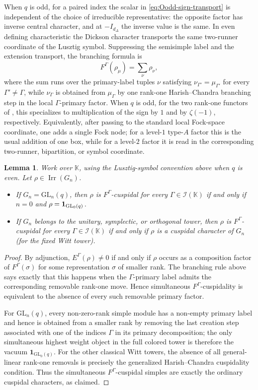 \documentclass[12pt]{amsart}
\numberwithin{itemcounter}{subsection}
\theoremstyle{plain}
\newtheorem{lemma}[theorem]{Lemma}
\theoremstyle{definition}
\theoremstyle{remark}
\numberwithin{equation}{section}
\def\bbK{\mathbb{K}}
\def\calI{\mathcal{I}}
\def\Irr{{\operatorname{Irr}\nolimits}}
\def\GL{\mathrm{GL}}
\begin{document}
When $q$ is odd, for a paired index the scalar in
\eqref{eq:Oodd-sign-transport} is independent of the choice of irreducible representative: the
opposite factor has inverse central character, and at \(-I_{d_\Delta}\) the
inverse value is the same.  In even defining characteristic the Dickson
character transports the same two-runner coordinate of the Lusztig symbol.  Suppressing
the semisimple label and the extension transport, the branching formula is
\[
 F^\Gamma(\rho_{\mu})=\sum_{\nu}\rho_{\nu},
\]
where the sum runs over the primary-label tuples \(\nu\) satisfying
\(\nu_{\Gamma'}=\mu_{\Gamma'}\) for every \(\Gamma'\ne\Gamma\), while
\(\nu_\Gamma\) is obtained from \(\mu_\Gamma\) by one rank-one
Harish--Chandra branching step in the local \(\Gamma\)-primary factor.
When $q$ is odd, for the two
rank-one functors of \cite[(4.21)--(4.22)]{LSZ25}, this specializes to
multiplication of the sign by \(1\) and by \(\zeta(-1)\), respectively.
Equivalently, after passing
to the standard local Fock-space coordinate, one adds a single Fock node; for
a level-$1$ type-$A$ factor this is the usual addition of one box, while for a
level-$2$ factor it is read in the corresponding two-runner, bipartition, or
symbol coordinate.
\begin{lemma}\label{Lem:cuspidal}
Work over $\bbK$, using the Lusztig-symbol convention above when $q$ is
even.  Let $\rho\in\Irr(G_n)$.
\begin{itemize}
    \item[$(1)$] If $G_n=\GL_n(q)$, then $\rho$ is
 $F^\Gamma$-cuspidal for every $\Gamma\in\calI(\bbK)$ if and only if
 $n=0$ and $\rho={\bf 1}_{\GL_0(q)}$.

 \item[$(2)$] If $G_n$ belongs to the unitary, symplectic, or orthogonal
 tower, then $\rho$ is $F^\Gamma$-cuspidal for every
 $\Gamma\in\calI(\bbK)$ if and only if $\rho$ is a cuspidal character of
 $G_n$ (for the fixed Witt tower).
 \end{itemize}
\end{lemma}
\begin{proof}
By adjunction, \(E^\Gamma(\rho)\ne0\) if and only if \(\rho\) occurs as a
composition factor of \(F^\Gamma(\sigma)\) for some representation \(\sigma\)
of smaller rank.  The branching rule above says exactly that this happens when
the \(\Gamma\)-primary label admits the corresponding removable rank-one
move.  Hence simultaneous \(F^\Gamma\)-cuspidality is equivalent to the
absence of every such removable primary factor.

For \(\GL_n(q)\), every non-zero-rank simple module has a non-empty primary
label and hence is obtained from a smaller rank by removing the last creation
step associated with one of the indices $\Gamma$ in its primary decomposition; the only simultaneous highest
weight object in the full colored tower is therefore the vacuum
\(\mathbf1_{\GL_0(q)}\).  For the other classical Witt towers, the absence of
all general-linear rank-one removals is precisely the generalized
Harish--Chandra cuspidality condition.  Thus the simultaneous
\(F^\Gamma\)-cuspidal simples are exactly the ordinary cuspidal characters,
as claimed.
\end{proof}
\end{document}
